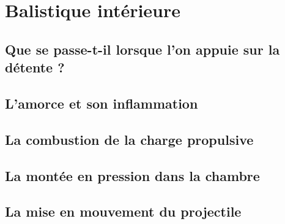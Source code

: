 
\chapter*{}

\cleardoublepage
{}
\renewcommand{\CurrentPartColor}{Part6Color}
\renewcommand{\CurrentPartNumber}{Partie 06}
\renewcommand{\CurrentPartName}{Balistique intérieure}
\renewcommand{\CurrentChapterType}{Chapitre}


\part{Balistique intérieure}

    \chapter{Que se passe-t-il lorsque l'on appuie sur la détente ?}
    \label{chap:depart_du_coup}
    

    \chapter{L'amorce et son inflammation}
    \label{chap:amorce_inflammation}
    

    \chapter{La combustion de la charge propulsive}
    \label{chap:combustion_charge_propulsive}
    

    \chapter{La montée en pression dans la chambre}
    \label{chap:montee_pression_chambre}
    

    \chapter{La mise en mouvement du projectile}
    \label{chap:mise_mouvement_projectile}
    

